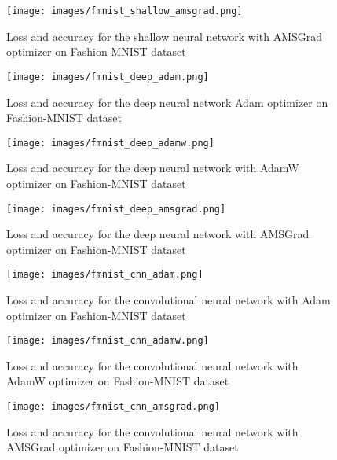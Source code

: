 \documentclass{article} %
\begin{document}
\begin{figure}[h]
\begin{center}
\texttt{[image: images/fmnist\_shallow\_amsgrad.png]}
\end{center}
\caption{Loss and accuracy for the shallow neural network with AMSGrad optimizer on Fashion-MNIST dataset}
\end{figure}

\begin{figure}[h]
\begin{center}
\texttt{[image: images/fmnist\_deep\_adam.png]}
\end{center}
\caption{Loss and accuracy for the deep neural network Adam optimizer on Fashion-MNIST dataset}
\end{figure}

\begin{figure}[h]
\begin{center}
\texttt{[image: images/fmnist\_deep\_adamw.png]}
\end{center}
\caption{Loss and accuracy for the deep neural network with AdamW optimizer on Fashion-MNIST dataset}
\end{figure}

\begin{figure}[h]
\begin{center}
\texttt{[image: images/fmnist\_deep\_amsgrad.png]}
\end{center}
\caption{Loss and accuracy for the deep neural network with AMSGrad optimizer on Fashion-MNIST dataset}
\end{figure}

\begin{figure}[h]
\begin{center}
\texttt{[image: images/fmnist\_cnn\_adam.png]}
\end{center}
\caption{Loss and accuracy for the convolutional neural network with Adam optimizer on Fashion-MNIST dataset}
\end{figure}

\begin{figure}[h]
\begin{center}
\texttt{[image: images/fmnist\_cnn\_adamw.png]}
\end{center}
\caption{Loss and accuracy for the convolutional neural network with AdamW optimizer on Fashion-MNIST dataset}
\end{figure}

\begin{figure}[h]
\begin{center}
\texttt{[image: images/fmnist\_cnn\_amsgrad.png]}
\end{center}
\caption{Loss and accuracy for the convolutional neural network with AMSGrad optimizer on Fashion-MNIST dataset}
\end{figure}
\end{document}
